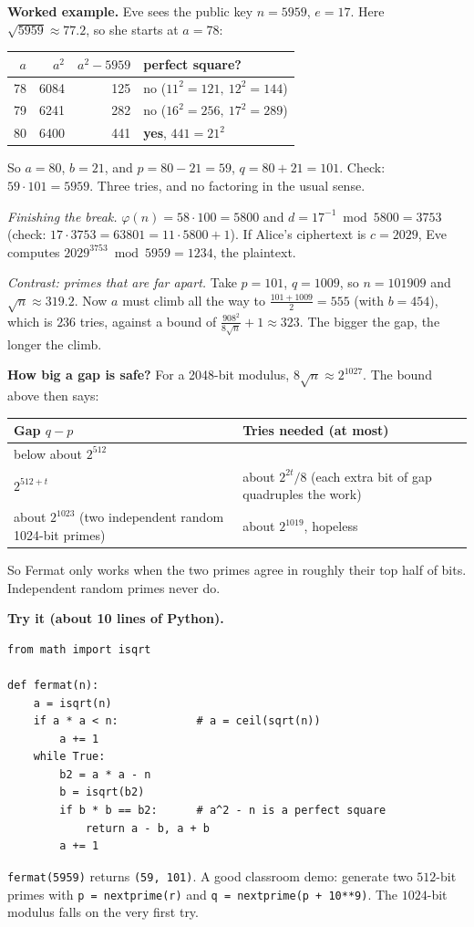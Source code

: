 \documentclass[11pt]{article}
\begin{document}
\textbf{Worked example.} Eve sees the public key $n=5959$, $e=17$. Here $\sqrt{5959}\approx77.2$, so she starts at $a=78$:
\begin{center}
\begin{tabular}{@{}rrrl@{}}
\toprule
$a$ & $a^2$ & $a^2-5959$ & perfect square? \\
\midrule
78 & 6084 & 125 & no ($11^2=121,\ 12^2=144$) \\
79 & 6241 & 282 & no ($16^2=256,\ 17^2=289$) \\
80 & 6400 & 441 & \textbf{yes}, $441=21^2$ \\
\bottomrule
\end{tabular}
\end{center}
So $a=80$, $b=21$, and $p=80-21=59$, $q=80+21=101$. Check: $59\cdot101=5959$. Three tries, and no factoring in the usual sense.

\emph{Finishing the break.} $\varphi(n)=58\cdot100=5800$ and $d=17^{-1}\bmod5800=3753$ (check: $17\cdot3753=63801=11\cdot5800+1$). If Alice's ciphertext is $c=2029$, Eve computes $2029^{3753}\bmod5959=1234$, the plaintext.

\emph{Contrast: primes that are far apart.} Take $p=101$, $q=1009$, so $n=101909$ and $\sqrt n\approx319.2$. Now $a$ must climb all the way to $\tfrac{101+1009}{2}=555$ (with $b=454$), which is $236$ tries, against a bound of $\tfrac{908^2}{8\sqrt n}+1\approx323$. The bigger the gap, the longer the climb.

\textbf{How big a gap is safe?} For a 2048-bit modulus, $8\sqrt n\approx2^{1027}$. The bound above then says:
\begin{center}
\begin{tabular}{@{}>{\raggedright\arraybackslash}p{6.8cm}>{\raggedright\arraybackslash}p{7.6cm}@{}}
\toprule
\textbf{Gap $q-p$} & \textbf{Tries needed (at most)} \\
\midrule
below about $2^{512}$ & 1 \\
$2^{512+t}$ & about $2^{2t}/8$ (each extra bit of gap quadruples the work) \\
about $2^{1023}$ (two independent random 1024-bit primes) & about $2^{1019}$, hopeless \\
\bottomrule
\end{tabular}
\end{center}
So Fermat only works when the two primes agree in roughly their top half of bits. Independent random primes never do.

\textbf{Try it (about 10 lines of Python).}
\begin{verbatim}
from math import isqrt

def fermat(n):
    a = isqrt(n)
    if a * a < n:            # a = ceil(sqrt(n))
        a += 1
    while True:
        b2 = a * a - n
        b = isqrt(b2)
        if b * b == b2:      # a^2 - n is a perfect square
            return a - b, a + b
        a += 1
\end{verbatim}
\texttt{fermat(5959)} returns \texttt{(59, 101)}. A good classroom demo: generate two $512$-bit primes with \texttt{p = nextprime(r)} and \texttt{q = nextprime(p + 10**9)}. The $1024$-bit modulus falls on the very first try.
\end{document}
